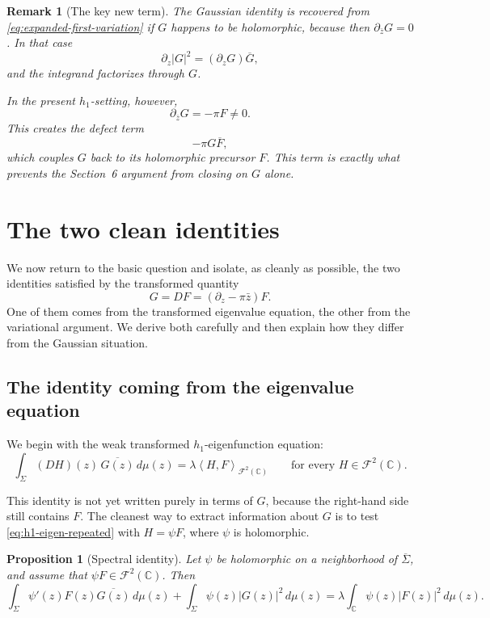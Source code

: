 \documentclass[11pt]{article}
\newtheorem{proposition}[theorem]{Proposition}
\newtheorem{remark}[theorem]{Remark}
\newcommand{\C}{\mathbb C}
\newcommand{\F}{\mathcal F^2(\C)}
\newcommand{\dmu}{\,d\mu}
\newcommand{\pw}{\partial_z}
\newcommand{\pwb}{\partial_{\bar z}}
\newcommand{\1}{\mathbf 1}
\newcommand{\inner}[2]{\left\langle #1,#2\right\rangle}
\newcommand{\abs}[1]{\left|#1\right|}
\begin{document}
\begin{remark}[The key new term]\label{rem:key-new-term}
The Gaussian identity is recovered from \eqref{eq:expanded-first-variation} if \(G\)
happens to be holomorphic, because then \(\pwb G=0\). In that case
\[
\pw\abs{G}^2=(\pw G)\overline G,
\]
and the integrand factorizes through \(G\).

In the present \(h_1\)-setting, however,
\[
\pwb G=-\pi F\neq 0.
\]
This creates the defect term
\[
-\pi G\overline F,
\]
which couples \(G\) back to its holomorphic precursor \(F\). This term is exactly
what prevents the Section~6 argument from closing on \(G\) alone.
\end{remark}

\section{The two clean identities}

We now return to the basic question and isolate, as cleanly as possible, the two
identities satisfied by the transformed quantity
\[
G=DF=(\pw-\pi\bar z)F.
\]
One of them comes from the transformed eigenvalue equation, the other from the
variational argument. We derive both carefully and then explain how they differ from
the Gaussian situation.

\subsection{The identity coming from the eigenvalue equation}

We begin with the weak transformed \(h_1\)-eigenfunction equation:
\begin{equation}\label{eq:h1-eigen-repeated}
\int_\Sigma (D H)(z)\,\overline{G(z)}\dmu(z)
=
\lambda \inner{H}{F}_{\F}
\qquad
\text{for every }H\in \F.
\end{equation}

This identity is not yet written purely in terms of \(G\), because the right-hand side
still contains \(F\). The cleanest way to extract information about \(G\) is to test
\eqref{eq:h1-eigen-repeated} with \(H=\psi F\), where \(\psi\) is holomorphic.

\begin{proposition}[Spectral identity]\label{prop:spectral-identity}
Let \(\psi\) be holomorphic on a neighborhood of \(\overline\Sigma\), and assume that
\(\psi F\in \F\). Then
\begin{equation}\label{eq:spectral-identity}
\int_\Sigma \psi'(z)F(z)\overline{G(z)}\dmu(z)
+
\int_\Sigma \psi(z)\abs{G(z)}^2\dmu(z)
=
\lambda\int_\C \psi(z)\abs{F(z)}^2\dmu(z).
\end{equation}
\end{proposition}
\end{document}
